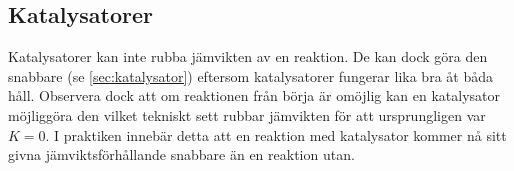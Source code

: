 \subsection{Katalysatorer}

Katalysatorer kan inte rubba jämvikten av en reaktion. De kan dock göra den snabbare (se \vref{sec:katalysator}) eftersom katalysatorer fungerar lika bra åt båda håll. Observera dock att om reaktionen från börja är omöjlig kan en katalysator möjliggöra den vilket tekniskt sett rubbar jämvikten för att ursprungligen var $K = 0$. I praktiken innebär detta att en reaktion med katalysator kommer nå sitt givna jämviktsförhållande snabbare än en reaktion utan.
